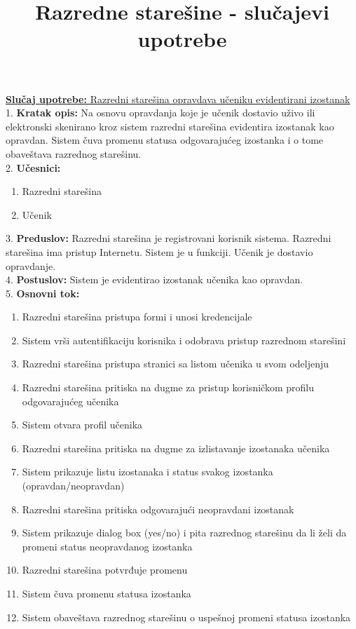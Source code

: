 \documentclass{article}
\title{Razredne starešine - slučajevi upotrebe}
\begin{document}
\maketitle

\underline{\textbf{Slučaj upotrebe:} Razredni starešina opravdava učeniku evidentirani izostanak} \\

1. \textbf{Kratak opis:} Na osnovu opravdanja koje je učenik dostavio uživo ili elektronski skenirano kroz sistem razredni starešina evidentira izostanak kao opravdan. Sistem čuva promenu statusa odgovarajućeg izostanka i o tome obaveštava razrednog starešinu. \\

2. \textbf{Učesnici:}
\begin{enumerate} [label=(\alph*)]
\item Razredni starešina
\item Učenik
\end{enumerate} 

3. \textbf{Preduslov:} Razredni starešina je registrovani korisnik sistema. Razredni starešina ima pristup Internetu. Sistem je u funkciji. Učenik je dostavio opravdanje. \\

4. \textbf{Postuslov:} Sistem je evidentirao izostanak učenika kao opravdan.\\

5. \textbf{Osnovni tok:} 
\begin{enumerate} [label=(\alph*)]
\item Razredni starešina pristupa formi i unosi kredencijale 
\item Sistem vrši autentifikaciju korisnika i odobrava pristup razrednom starešini
\item Razredni starešina pristupa stranici sa listom učenika u svom odeljenju
\item Razredni starešina pritiska na dugme za pristup korisničkom profilu odgovarajućeg učenika
\item Sistem otvara profil učenika
\item Razredni starešina pritiska na dugme za izlistavanje izostanaka učenika
\item Sistem prikazuje listu izostanaka i status svakog izostanka (opravdan/neopravdan)
\item Razredni starešina pritiska odgovarajući neopravdani izostanak
\item Sistem prikazuje dialog box (yes/no) i pita razrednog starešinu da li želi da promeni status neopravdanog izostanka
\item Razredni starešina potvrđuje promenu
\item Sistem čuva promenu statusa izostanka
\item Sistem obaveštava razrednog starešinu o uspešnoj promeni statusa izostanka
\end{enumerate}
\end{document}

